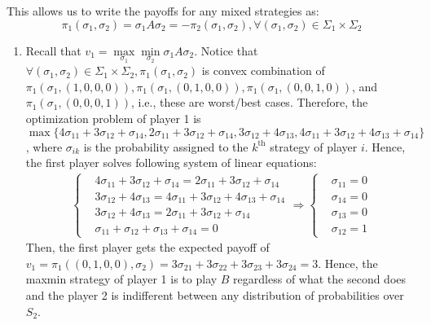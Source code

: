 \documentclass[]{article}
\begin{document}
This allows us to write the payoffs for any mixed strategies as:
\begin{equation}
\pi_1(\sigma_1, \sigma_2) = \sigma_1A\sigma_2 = -\pi_2(\sigma_1, \sigma_2), \forall (\sigma_1, \sigma_2) \in \Sigma_1\times\Sigma_2 \nonumber
\end{equation}

\begin{enumerate}[label=(\roman*)]
	\item Recall that $v_1 = \max\limits_{\sigma_1}\min\limits_{\sigma_2}\sigma_1A\sigma_2$. Notice that $\forall (\sigma_1, \sigma_2)\in\Sigma_1\times\Sigma_2, \pi_1(\sigma_1, \sigma_2)$ is convex combination of $\pi_1(\sigma_1, (1, 0, 0, 0)), \pi_1(\sigma_1, (0, 1, 0, 0)), \pi_1(\sigma_1, (0, 0, 1, 0))$, and $\pi_1(\sigma_1, (0, 0, 0, 1))$, i.e., these are worst/best cases. Therefore, the optimization problem of player 1 is $\max\{4\sigma_{11} + 3\sigma_{12} + \sigma_{14}, 2\sigma_{11} + 3\sigma_{12} + \sigma_{14}, 3\sigma_{12} + 4\sigma_{13}, 4\sigma_{11} + 3\sigma_{12} + 4\sigma_{13} + \sigma_{14}\}$, where $\sigma_{ik}$ is the probability assigned to the $k^\text{th}$ strategy of player $i$. Hence, the first player solves following system of linear equations:
	\begin{equation}
		\begin{split}
			\begin{cases}
				&4\sigma_{11} + 3\sigma_{12} + \sigma_{14} = 2\sigma_{11} + 3\sigma_{12} + \sigma_{14} \\
				&3\sigma_{12} + 4\sigma_{13} = 4\sigma_{11} + 3\sigma_{12} + 4\sigma_{13} + \sigma_{14} \\
				&3\sigma_{12} + 4\sigma_{13} = 2\sigma_{11} + 3\sigma_{12} + \sigma_{14} \\
				&\sigma_{11} + \sigma_{12} + \sigma_{13} + \sigma_{14} = 0
			\end{cases} \Rightarrow
			\begin{cases}
				&\sigma_{11} = 0 \\
				&\sigma_{14} = 0 \\
				&\sigma_{13} = 0 \\
				&\sigma_{12} = 1
			\end{cases} \nonumber
		\end{split}
	\end{equation}
	Then, the first player gets the expected payoff of $v_1 = \pi_1((0, 1, 0, 0), \sigma_{2}) = 3\sigma_{21} + 3\sigma_{22} + 3\sigma_{23} + 3\sigma_{24} = 3$. Hence, the maxmin strategy of player 1 is to play $B$ regardless of what the second does and the player 2 is indifferent between any distribution of probabilities over $S_2$.
	

\end{enumerate}
\end{document}
